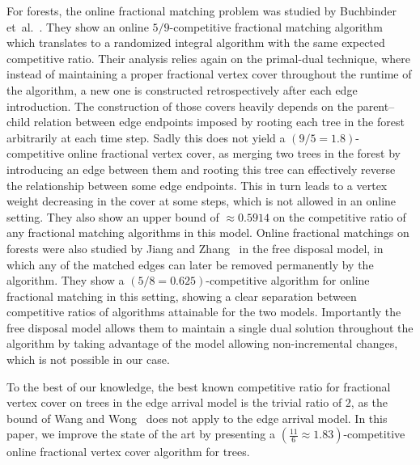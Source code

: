 \documentclass[a4paper,USenglish,cleveref,autoref,thm-restate,pdfa]{lipics-v2021}
\begin{document}
For forests, the online fractional matching problem was studied by Buchbinder et~al.~\cite{BuchbinderSegevTkach19}. 
They show an online $5/9$-competitive fractional matching algorithm which translates to a randomized integral algorithm with the same expected competitive ratio. 
Their analysis relies again on the primal-dual technique, where instead of maintaining a proper fractional vertex cover throughout the runtime of the algorithm, a new one is constructed retrospectively after each edge introduction.
The construction of those covers heavily depends on the parent--child relation between edge endpoints imposed by rooting each tree in the forest arbitrarily at each time step. 
Sadly this does not yield a $(9/5=1.8)$-competitive online fractional vertex cover, 
as merging two trees in the forest by introducing an edge between them and rooting this tree can effectively reverse the relationship between some edge endpoints.
This in turn leads to a vertex weight decreasing in the cover at some steps, which is not allowed in an online setting.
They also show an upper bound of $\approx0.5914$ on the competitive ratio of any fractional matching algorithms in this model. 
Online fractional matchings on forests were also studied by Jiang and Zhang~\cite{JiangZhang2026} in the free disposal model, in which any of the matched edges can later be removed permanently by the algorithm. 
They show a $(5/8 = 0.625)$-competitive algorithm for online fractional matching in this setting, showing a clear separation between competitive ratios of algorithms attainable for the two models.
Importantly the free disposal model allows them to maintain a single dual solution throughout the algorithm
by taking advantage of the model allowing non-incremental changes, which is not possible in our case.

To the best of our knowledge, the best known competitive ratio for fractional vertex cover on trees in the edge arrival model is the trivial ratio of $2$, as the bound of Wang and Wong~\cite{WangW2015} does not apply to the edge arrival model. 
In this paper, we improve the state of the art by presenting a $(\frac{11}{6} \approx 1.83)$-competitive online fractional vertex cover algorithm for trees.
\end{document}
